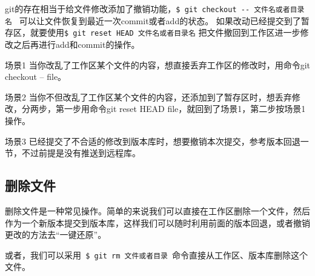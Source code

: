 \documentclass[UTF8]{ctexart}
\begin{document}
git的存在相当于给文件修改添加了撤销功能，\verb!$ git checkout -- 文件名或者目录名 ! 可以让文件恢复到最近一次commit或者add的状态。
如果改动已经提交到了暂存区，就要使用\verb!$ git reset HEAD 文件名或者目录名! 把文件撤回到工作区进一步修改之后再进行add和commit的操作。

\begin{list}{场景}{\textbf{撤销更改的几种情况}}
\item[场景1]当你改乱了工作区某个文件的内容，想直接丢弃工作区的修改时，用命令git checkout -- file。
\item[场景2]当你不但改乱了工作区某个文件的内容，还添加到了暂存区时，想丢弃修改，分两步，第一步用命令git reset HEAD file，就回到了场景1，第二步按场景1操作。
\item[场景3]已经提交了不合适的修改到版本库时，想要撤销本次提交，参考版本回退一节，不过前提是没有推送到远程库。
\end{list}

\subsection{删除文件}
删除文件是一种常见操作。简单的来说我们可以直接在工作区删除一个文件，然后作为一个新版本提交到版本库，这样我们可以随时利用前面的版本回退，或者撤销更改的方法去“一键还原”。

或者，我们可以采用\verb! $ git rm 文件或者目录 !命令直接从工作区、版本库删除这个文件。
\end{document}
